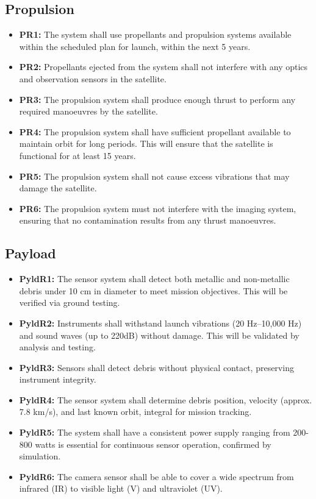 \subsection{Propulsion}
\begin{itemize}
    \item \textbf{PR1:} The system shall use propellants and propulsion systems available within the scheduled plan for launch, within the next 5 years. 
    \item \textbf{PR2:} Propellants ejected from the system shall not interfere with any optics and observation sensors in the satellite. 
    \item \textbf{PR3:} The propulsion system shall produce enough thrust to perform any required manoeuvres by the satellite.
    \item \textbf{PR4:} The propulsion system shall have sufficient propellant available to maintain orbit for long periods. This will ensure that the satellite is functional for at least 15 years. 
    \item \textbf{PR5:} The propulsion system shall not cause excess vibrations that may damage the satellite.
    \item \textbf{PR6:} The propulsion system must not interfere with the imaging system, ensuring that no contamination results from any thrust manoeuvres. 
\end{itemize}
\subsection{Payload}

\begin{itemize}
    \item \textbf{PyldR1:} The sensor system shall detect both metallic and non-metallic debris under 10 cm in diameter to meet mission objectives. This will be verified via ground testing.
    \item \textbf{PyldR2:} Instruments shall withstand launch vibrations (20 Hz–10,000 Hz) and sound waves (up to 220dB) without damage. This will be validated by analysis and testing.
    \item \textbf{PyldR3:} Sensors shall detect debris without physical contact, preserving instrument integrity.
    \item \textbf{PyldR4:} The sensor system shall determine debris position, velocity (approx. 7.8 km/s), and last known orbit, integral for mission tracking.
    \item \textbf{PyldR5:} The system shall have a consistent power supply ranging from 200-800 watts is essential for continuous sensor operation, confirmed by simulation.
    \item \textbf{PyldR6:} The camera sensor shall be able to cover a wide spectrum from infrared (IR) to visible light (V) and ultraviolet (UV).
\end{itemize}

